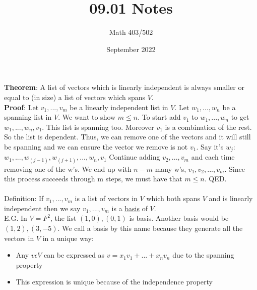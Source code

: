 \documentclass{article}
\title{09.01 Notes}
\author{Math 403/502}
\date{September 2022}
\begin{document}
\maketitle

\textbf{Theorem}: A list of vectors which is linearly independent is always smaller or equal to (in size) a list of vectors which spans $V$. \\

\textbf{Proof}: Let $v_1, ..., v_m$ be a linearly independent list in $V$. Let $w_1, ..., w_n$ be a spanning list in $V$. We want to show $m \leq n$. To start add $v_1$ to $w_1, ..., w_n$ to get $w_1, ..., w_n, v_1$. This list is spanning too. Moreover $v_1$ is a combination of the rest. So the list is dependent. Thus, we can remove one of the vectors and it will still be spanning and we can ensure the vector we remove is not $v_1$. Say it's $w_j$:
$w_1, ..., w_(j-1), w_(j+1), ..., w_n, v_1$
Continue adding $v_2, ..., v_m$ and each time removing one of the w's. We end up with $n-m$ many w's, $v_1, v_2, ..., v_m$. Since this process succeeds through m steps, we must have that $m \leq n$. QED. \\ \\

Definition: If $v_1, ..., v_m$ is a list of vectors in $V$ which both spans $V$ and is linearly independent then we say $v_1, ..., v_m$ is a \underline{basis} of $V$. \\
E.G. In $V=F^2$, the list $(1,0), (0,1)$ is basis. Another basis would be $(1,2), (3, -5)$. We call a basis by this name because they generate all the vectors in $V$ in a unique way: 
\begin{itemize}
\item Any $v \epsilon V$ can be expressed as $v = x_1v_1 + ... + x_nv_n$ due to the spanning property
\item This expression is unique because of the independence property 

\end{itemize}
\end{document}
